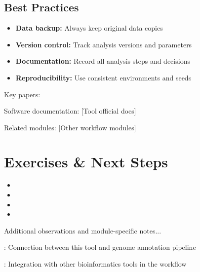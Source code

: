 \documentclass[a4paper,11pt]{article}
\begin{document}
\subsection{Best Practices}
\begin{itemize}
    \item \textbf{Data backup:} Always keep original data copies
    \item \textbf{Version control:} Track analysis versions and parameters
    \item \textbf{Documentation:} Record all analysis steps and decisions
    \item \textbf{Reproducibility:} Use consistent environments and seeds
\end{itemize}

\begin{references}
    \item Key papers: \cite{example2024,author2024,smith2024}
    \item Software documentation: [Tool official docs]
    \item Related modules: [Other workflow modules]
\end{references}

\section{Exercises \& Next Steps}

\begin{itemize}
    \item {}
    \item {}
    \item {}
    \item {}
\end{itemize}

\begin{notes}
Additional observations and module-specific notes...

: Connection between this tool and genome annotation pipeline

: Integration with other bioinformatics tools in the workflow

\end{notes}

\newpage
\printbibliography
\end{document}
